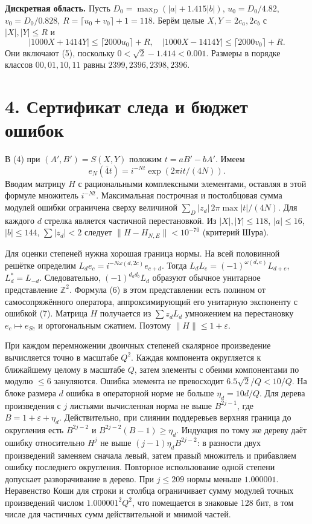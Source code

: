\documentclass[11pt,a4paper]{article}
\newcommand{\Z}{\mathbb Z}
\newcommand{\eps}{\varepsilon}
\newcommand{\sect}[1]{\section*{\sffamily\color{ink}#1}}
\newcommand{\subt}[1]{\par\medskip\noindent\textbf{#1.}\quad}
\begin{document}
\subt{Дискретная область} Пусть $D_0=\max_D(|a|+1.415|b|)$, $u_0=D_0/4.82$, $v_0=D_0/0.828$, $R=\lceil u_0+v_0\rceil+1=118$. Берём целые $X,Y=2c_a,2c_b$ с $|X|,|Y|\le R$ и
\[
 |1000X+1414Y|\le\lceil2000u_0\rceil+R,\quad
 |1000X-1414Y|\le\lceil2000v_0\rceil+R .
\]
Они включают (5), поскольку $0<\sqrt2-1.414<0.001$. Размеры в порядке классов $00,01,10,11$ равны $2399,2396,2398,2396$.
\newpage
\sect{4. Сертификат следа и бюджет ошибок}
В (4) при $(A',B')=S(X,Y)$ положим $t=aB'-bA'$. Имеем
\[
 e_N(\bar4 t)=i^{-Nt}\exp(2\pi i t/(4N)).
\]
Вводим матрицу $H$ с рациональными комплексными элементами, оставляя в этой формуле множитель $i^{-Nt}$. Максимальная построчная и постолбцовая сумма модулей ошибки ограничена сверху величиной $\sum_D|z_d|\,2\pi\max|t|/(4N)$. Для каждого $d$ стрелка является частичной перестановкой. Из $|X|,|Y|\le118$, $|a|\le16$, $|b|\le144$, $\sum|z_d|<2$ следует $\|H-H_{N,E}\|<10^{-70}$ (критерий Шура).

Для оценки степеней нужна хорошая граница нормы. На всей половинной решётке определим $L_de_c=i^{-N\omega(d,2c)}e_{c+d}$. Тогда $L_dL_e=(-1)^{\omega(d,e)}L_{d+e}$, $L_d^*=L_{-d}$. Следовательно, $(-1)^{d_ad_b}L_d$ образуют обычное унитарное представление $\Z^2$. Формула (6) в этом представлении есть полином от самосопряжённого оператора, аппроксимирующий его унитарную экспоненту с ошибкой (7). Матрица $H$ получается из $\sum z_dL_d$ умножением на перестановку $e_c\mapsto e_{Sc}$ и ортогональным сжатием. Поэтому $\|H\|\le1+\eps$.

При каждом перемножении двоичных степеней скалярное произведение вычисляется точно в масштабе $Q^2$. Каждая компонента округляется к ближайшему целому в масштабе $Q$, затем элементы с обеими компонентами по модулю $\le6$ зануляются. Ошибка элемента не превосходит $6.5\sqrt2/Q<10/Q$. На блоке размера $d$ ошибка в операторной норме не больше $\eta_d=10d/Q$. Для дерева произведения с $j$ листьями вычисленная норма не выше $B^{2j-1}$, где $B=1+\eps+\eta_d$. Действительно, при слиянии поддеревьев верхняя граница до округления есть $B^{2j-2}$ и $B^{2j-2}(B-1)\ge\eta_d$. Индукция по тому же дереву даёт ошибку относительно $H^j$ не выше $(j-1)\eta_d B^{2j-2}$: в разности двух произведений заменяем сначала левый, затем правый множитель и прибавляем ошибку последнего округления. Повторное использование одной степени допускает разворачивание в дерево. При $j\le209$ нормы меньше $1.000001$. Неравенство Коши для строки и столбца ограничивает сумму модулей точных произведений числом $1.000001^2Q^2$, что помещается в знаковые 128 бит, в том числе для частичных сумм действительной и мнимой частей.
\end{document}
